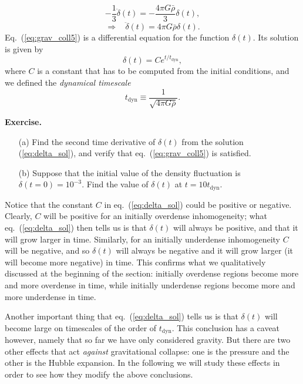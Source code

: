 \begin{equation}
-\frac{1}{3}\ddot{\delta}(t)=-\frac{4\pi G\bar{\rho}}{3}\delta(t),
\end{equation}
\begin{equation} \label{eq:grav_coll5}
\Rightarrow~~~~ \ddot{\delta}(t)=4\pi G\bar{\rho}\delta(t).
\end{equation}
Eq.\ (\ref{eq:grav_coll5}) is a differential equation for the function $\delta(t)$. Its solution is given by
\begin{equation} \label{eq:delta_sol}
\delta(t)=Ce^{t/t_{\mathrm{dyn}}},
\end{equation}
where $C$ is a constant that has to be computed from the initial conditions, and we defined the {\it dynamical timescale}
\begin{equation}
t_{\mathrm{dyn}}\equiv \frac{1}{\sqrt{4\pi G \bar{\rho}}}.
\end{equation}

\newpage

{\bf Exercise.}
\begin{itemize}
\item [(a)] Find the second time derivative of $\delta(t)$ from the solution (\ref{eq:delta_sol}), and verify that eq.\ (\ref{eq:grav_coll5}) is satisfied.
\item [(b)] Suppose that the initial value of the density fluctuation is $\delta(t=0)=10^{-3}$. Find the value of $\delta(t)$ at $t=10t_{\mathrm{dyn}}$.
\end{itemize}

\par\vspace{\baselineskip}

Notice that the constant $C$ in eq.\ (\ref{eq:delta_sol}) could be positive or negative. Clearly, $C$ will be positive for an initially overdense inhomogeneity; what eq.\ (\ref{eq:delta_sol}) then tells us is that $\delta(t)$ will always be positive, and that it will grow larger in time. Similarly, for an initially underdense inhomogeneity $C$ will be negative, and so $\delta(t)$ will always be negative and it will grow larger (it will become more negative) in time. This confirms what we qualitatively discussed at the beginning of the section: initially overdense regions become more and more overdense in time, while initially underdense regions become more and more underdense in time.

Another important thing that eq.\ (\ref{eq:delta_sol}) tells us is that $\delta(t)$ will become large on timescales of the order of $t_{\mathrm{dyn}}$. This conclusion has a caveat however, namely that so far we have only considered gravity. But there are two other effects that act {\it against} gravitational collapse: one is the pressure and the other is the Hubble expansion. In the following we will study these effects in order to see how they modify the above conclusions.

